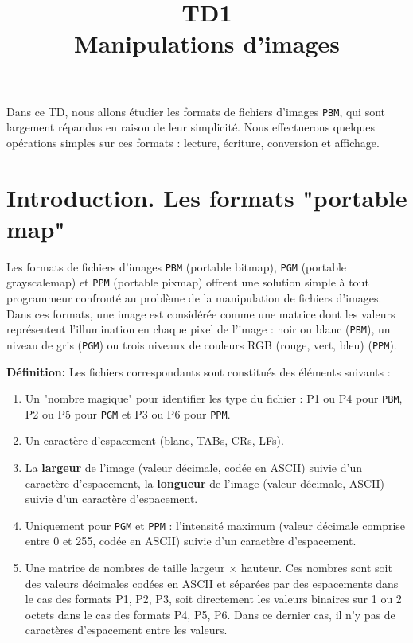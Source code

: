 \documentclass[a4paper, 11pt, french]{article}
\title{\bf{TD1 \\ Manipulations d'images}}
\author{}
\date{}
\begin{document}
\maketitle

\par Dans ce TD, nous allons étudier les formats de fichiers d'images {\tt PBM}, qui sont largement répandus en raison de leur simplicité. Nous effectuerons quelques opérations simples sur ces formats : lecture, écriture, conversion et affichage.


\section*{\bf Introduction. \rm Les formats "portable map"}

\par Les formats de fichiers d'images {\tt PBM} (portable bitmap), {\tt PGM} (portable grayscalemap) et {\tt PPM} (portable pixmap) offrent une solution simple à tout programmeur confronté au problème de la manipulation de fichiers d'images. Dans ces formats, une image est considérée comme une matrice dont les valeurs représentent l'illumination en chaque pixel de l'image : noir ou blanc ({\tt PBM}), un niveau de gris ({\tt PGM}) ou trois niveaux de couleurs RGB (rouge, vert, bleu) ({\tt PPM}).

\bigskip
\bigskip
\noindent \textbf{Définition:} Les fichiers correspondants sont constitués des éléments suivants :
\begin{enumerate}
	\item Un "nombre magique" pour identifier les type du fichier : P1 ou P4 pour {\tt PBM}, P2 ou P5 pour {\tt PGM} et P3 ou P6 pour {\tt PPM}.
	\item Un caractère d'espacement (blanc, TABs, CRs, LFs).
	\item La \textbf{largeur} de l'image (valeur décimale, codée en ASCII) suivie d'un caractère d'espacement, la \textbf{longueur} de l'image (valeur décimale, ASCII) suivie d'un caractère d'espacement.
	\item Uniquement pour {\tt PGM} et {\tt PPM} : l'intensité maximum (valeur décimale comprise entre 0 et 255, codée en ASCII) suivie d'un caractère d'espacement.
	\item Une matrice de nombres de taille largeur $\times$ hauteur. Ces nombres sont soit des valeurs décimales codées en ASCII et séparées par des espacements dans le cas des formats P1, P2, P3, soit directement les valeurs binaires sur 1 ou 2 octets dans le cas des formats P4, P5, P6. Dans ce dernier cas, il n'y pas de caractères d'espacement entre les valeurs.
\end{enumerate}
\end{document}

